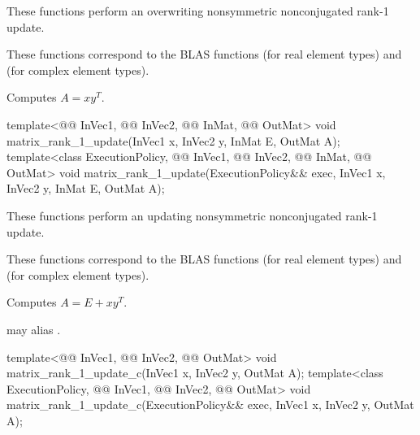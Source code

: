 \begin{itemdescr}
\pnum
These functions perform an overwriting nonsymmetric nonconjugated rank-1 update.
\begin{note}
These functions correspond to the BLAS functions
 (for real element types) and
 (for complex element types)\supercite{blas2}.
\end{note}

\pnum
\effects
Computes $A = x y^T$.
\end{itemdescr}

%
\begin{itemdecl}
template<@@ InVec1, @@ InVec2, @@ InMat, @@ OutMat>
  void matrix_rank_1_update(InVec1 x, InVec2 y, InMat E, OutMat A);
template<class ExecutionPolicy, @@ InVec1, @@ InVec2, @@ InMat,
         @@ OutMat>
  void matrix_rank_1_update(ExecutionPolicy&& exec, InVec1 x, InVec2 y, InMat E, OutMat A);
\end{itemdecl}

\begin{itemdescr}
\pnum
These functions perform an updating nonsymmetric nonconjugated rank-1 update.
\begin{note}
These functions correspond to the BLAS functions
 (for real element types) and
 (for complex element types)\supercite{blas2}.
\end{note}

\pnum
\effects
Computes $A = E + x y^T$.

\pnum
\remarks
{} may alias .
\end{itemdescr}

%
\begin{itemdecl}
template<@@ InVec1, @@ InVec2, @@ OutMat>
  void matrix_rank_1_update_c(InVec1 x, InVec2 y, OutMat A);
template<class ExecutionPolicy, @@ InVec1, @@ InVec2, @@ OutMat>
  void matrix_rank_1_update_c(ExecutionPolicy&& exec, InVec1 x, InVec2 y, OutMat A);
\end{itemdecl}

